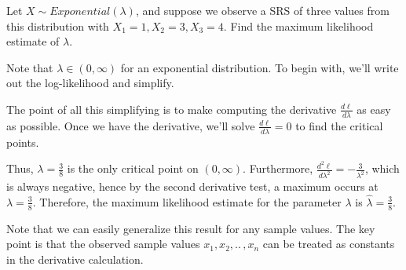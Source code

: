 \begin{examp}
Let $X \sim Exponential(\lambda)$, and suppose we observe a SRS of three values from this distribution with $X_1 = 1, X_2 = 3, X_3 = 4$. Find the maximum likelihood estimate of $\lambda$.
\par
\noindent Note that $\lambda \in (0,\infty)$ for an exponential distribution. To begin with, we'll write out the log-likelihood and simplify.
\par
\noindent The point of all this simplifying is to make computing the derivative $\frac{d\ell}{d\lambda}$ as easy as possible. Once we have the derivative, we'll solve $\frac{d\ell}{d\lambda} = 0$ to find the critical points.
\par
\noindent Thus, $\lambda = \frac{3}{8}$ is the only critical point on $(0,\infty)$. Furthermore, $\frac{d^2\ell}{d\lambda^2} = -\frac{3}{\lambda^2}$, which is always negative, hence by the second derivative test, a maximum occurs at $\lambda = \frac{3}{8}$. Therefore, the maximum likelihood estimate for the parameter $\lambda$ is $\widehat{\lambda} = \frac{3}{8}$.
\end{examp}

\par Note that we can easily generalize this result for any sample values. The key point is that the observed sample values $x_1, x_2, .. \,, x_n$ can be treated as constants in the derivative calculation. 

